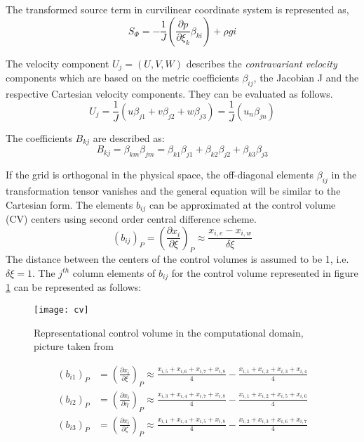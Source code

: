The transformed source term in curvilinear coordinate system is represented as,
\begin{equation}
S_{\Phi} = -\frac{1}{J}\left(\frac{\partial{p}}{\partial{\xi_k}}\beta_{ki}\right)+{\rho}gi
\end{equation}

The velocity component $U_j=\left(U,V,W\right)$ describes the \textit{contravariant velocity} components which are based on the metric coefficients $\beta_{ij}$, the Jacobian J and the respective Cartesian velocity components. They can be evaluated as follows.
\begin{equation}
U_j = \frac{1}{J}\left(u{\beta_{j1}}+v{\beta_{j2}}+w{\beta_{j3}}\right)=\frac{1}{J}\left(u_{n}{\beta_{jn}}\right)
\end{equation}

The coefficients $B_{kj}$ are described as:
\begin{equation}
B_{kj} = \beta_{km}\beta_{jm} = \beta_{k1}\beta_{j1}+\beta_{k2}\beta_{j2}+\beta_{k3}\beta_{j3}
\label{eqn:3.36}
\end{equation}

If the grid is orthogonal in the physical space, the off-diagonal elements $\beta_{ij}$ in the transformation tensor vanishes and the general equation will be similar to the Cartesian form. The elements $b_{ij}$ can be approximated at the control volume (CV) centers using second order central difference scheme.
\begin{equation}
\left(b_{ij}\right)_P = \left(\frac{\partial x_i}{\partial \xi}\right)_P \approx \frac{x_{i,e} - x_{i,w}}{\delta \xi}
\label{eqn:3.37}
\end{equation}
The distance between the centers of the control volumes is assumed to be 1, i.e. $\delta \xi = 1$. The $j^{th}$ column elements of $b_{ij}$ for the control volume represented in figure \ref{fig:3.2} can be represented as follows:
\begin{figure}[h]
\centering
\texttt{[image: cv]}
\caption{Representational control volume in the computational domain, picture taken from \citet{munsch2015entwicklung}}
\label{fig:3.2}
\end{figure}

\begin{align}
	\left(b_{i1}\right)_P &= \left(\frac{\partial x_i}{\partial \xi}\right)_P \approx \frac{x_{i,5} + x_{i,6} + x_{i,7} + x_{i,8}}{4} - \frac{x_{i,1} + x_{i,2} + x_{i,3} + x_{i,4}}{4}\\
	\left(b_{i2}\right)_P &= \left(\frac{\partial x_i}{\partial \eta}\right)_P \approx \frac{x_{i,3} + x_{i,4} + x_{i,7} + x_{i,8}}{4} - \frac{x_{i,1} + x_{i,2} + x_{i,5} + x_{i,6}}{4}\\
	\left(b_{i3}\right)_P &= \left(\frac{\partial x_i}{\partial \zeta}\right)_P \approx \frac{x_{i,1} + x_{i,4} + x_{i,5} + x_{i,8}}{4} - \frac{x_{i,2} + x_{i,3} + x_{i,6} + x_{i,7}}{4}
	\label{eqn:3.40}
\end{align}

